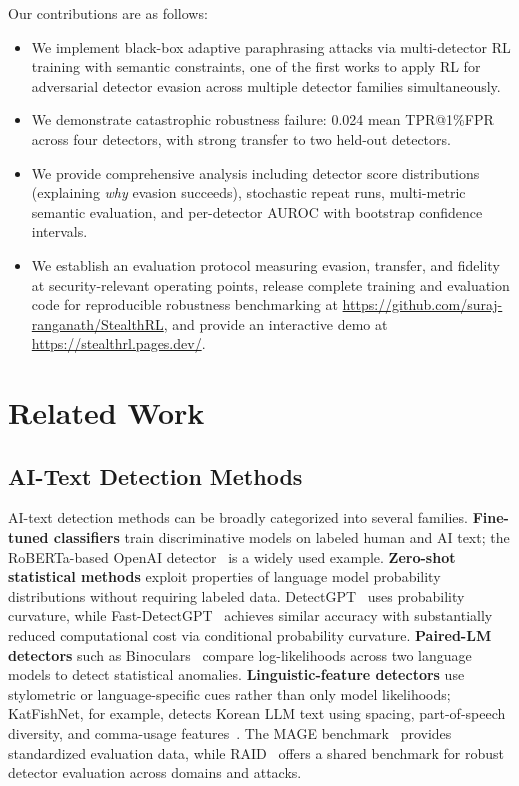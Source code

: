 \documentclass[11pt]{article}
\begin{document}
Our contributions are as follows:
\begin{itemize}[leftmargin=*,itemsep=2pt]
  \item We implement black-box adaptive paraphrasing attacks via multi-detector RL training with semantic constraints, one of the first works to apply RL for adversarial detector evasion across multiple detector families simultaneously.
  \item We demonstrate catastrophic robustness failure: 0.024 mean TPR@1\%FPR across four detectors, with strong transfer to two held-out detectors.
  \item We provide comprehensive analysis including detector score distributions (explaining \emph{why} evasion succeeds), stochastic repeat runs, multi-metric semantic evaluation, and per-detector AUROC with bootstrap confidence intervals.
  \item We establish an evaluation protocol measuring evasion, transfer, and fidelity at security-relevant operating points, release complete training and evaluation code for reproducible robustness benchmarking at \url{https://github.com/suraj-ranganath/StealthRL}, and provide an interactive demo at \url{https://stealthrl.pages.dev/}.
\end{itemize}

\section{Related Work}
\label{sec:related}

\subsection{AI-Text Detection Methods}

AI-text detection methods can be broadly categorized into several families. \textbf{Fine-tuned classifiers} train discriminative models on labeled human and AI text; the RoBERTa-based OpenAI detector~\cite{solaiman2019release} is a widely used example. \textbf{Zero-shot statistical methods} exploit properties of language model probability distributions without requiring labeled data. DetectGPT~\cite{mitchell2023detectgptzeroshotmachinegeneratedtext} uses probability curvature, while Fast-DetectGPT~\cite{bao2024fastdetectgptefficientzeroshotdetection} achieves similar accuracy with substantially reduced computational cost via conditional probability curvature. \textbf{Paired-LM detectors} such as Binoculars~\cite{hans2024spottingllmsbinocularszeroshot} compare log-likelihoods across two language models to detect statistical anomalies. \textbf{Linguistic-feature detectors} use stylometric or language-specific cues rather than only model likelihoods; KatFishNet, for example, detects Korean LLM text using spacing, part-of-speech diversity, and comma-usage features~\cite{park-etal-2025-katfishnet}. The MAGE benchmark~\cite{li2024magemachinegeneratedtextdetection} provides standardized evaluation data, while RAID~\cite{dugan2024raidsharedbenchmarkrobust} offers a shared benchmark for robust detector evaluation across domains and attacks.
\end{document}
